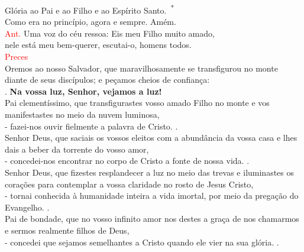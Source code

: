 \documentclass{book}
\begin{document}
\begin{center}
    \textsuperscript{\underline{\hspace{.06in}}} Glória ao Pai e ao Filho e ao Espírito Santo.\ \textsuperscript{*} \\
    Como era no princípio, agora e sempre. Amém.
    \vspace{.2cm} \\
    \textcolor{red}{Ant.} Uma voz do céu ressoa: Eis meu Filho muito amado, \\
    nele está meu bem-querer, escutai-o, homens todos.
    \vspace{.2cm} \\
    \textcolor{red}{Preces}
    \vspace{.2cm} \\
    Oremos ao nosso Salvador, que maravilhosamente se transfigurou no monte diante de seus discípulos; e peçamos cheios de confiança:
    \vspace{.2cm} \\
    {\color{red} \Rbar.} \textbf{Na vossa luz, Senhor, vejamos a luz!}
    \vspace{.2cm} \\
    Pai clementíssimo, que transfigurastes vosso amado Filho no monte e vos manifestastes no meio da nuvem luminosa, \\
    - fazei-nos ouvir fielmente a palavra de Cristo. {\color{red} \Rbar.}
    \vspace{.2cm} \\
    Senhor Deus, que saciais os vossos eleitos com a abundância da vossa casa e lhes dais a beber da torrente do vosso amor, \\
    - concedei-nos encontrar no corpo de Cristo a fonte de nossa vida. {\color{red} \Rbar.}
    \vspace{.2cm} \\
    Senhor Deus, que fizestes resplandecer a luz no meio das trevas e iluminastes os corações para contemplar a vossa claridade no rosto de Jesus Cristo, \\
    - tornai conhecida à humanidade inteira a vida imortal, por meio da pregação do Evangelho. {\color{red} \Rbar.}
    \vspace{.2cm} \\
    Pai de bondade, que no vosso infinito amor nos destes a graça de nos chamarmos e sermos realmente filhos de Deus, \\
    - concedei que sejamos semelhantes a Cristo quando ele vier na sua glória. {\color{red} \Rbar.}
    \vspace{.2cm} \\

\end{center}
\end{document}
